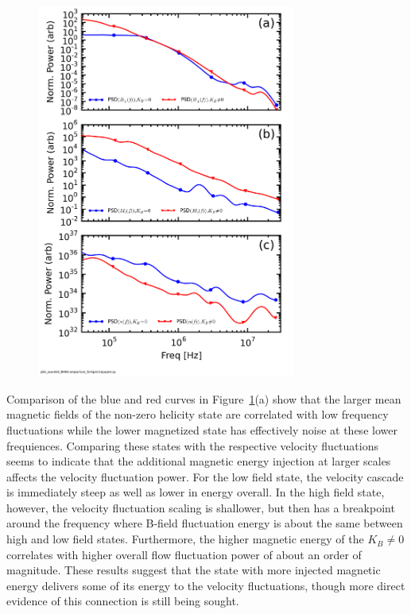 \documentclass[aip,prl,amsmath,amssymb,reprint,superscriptaddress]{revtex4-1} %
\begin{document}
\begin{figure}[!htbp]
\centerline{
\includegraphics[width=8.5cm]{BvsFlowvsDensspec_2fluxes_separateplots_40t60us}}
\caption{\label{fig:BvsFlow}}
\end{figure}

Comparison of the blue and red curves in Figure~\ref{fig:BvsFlow}(a) show that the larger mean magnetic fields of the non-zero helicity state are correlated with low frequency fluctuations while the lower magnetized state has effectively noise at these lower frequiences. Comparing these states with the respective velocity fluctuations seems to indicate that the additional magnetic energy injection at larger scales affects the velocity fluctuation power. For the low field state, the velocity cascade is immediately steep as well as lower in energy overall. In the high field state, however, the velocity fluctuation scaling is shallower, but then has a breakpoint around the frequency where B-field fluctuation energy is about the same between high and low field states. Furthermore, the higher magnetic energy of the $K_{B}\neq 0$ correlates with higher overall flow fluctuation power of about an order of magnitude. These results suggest that the state with more injected magnetic energy delivers some of its energy to the velocity fluctuations, though more direct evidence of this connection is still being sought.
\end{document}
